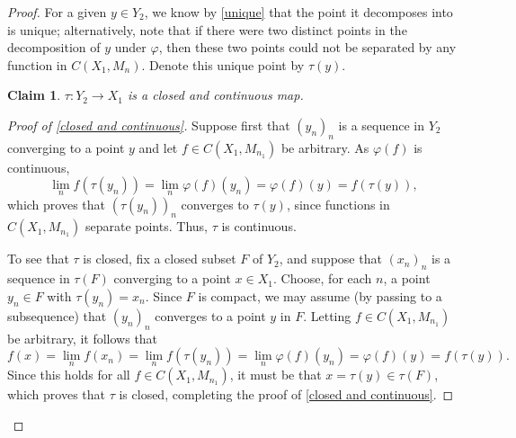 \documentclass[12pt]{amsart}
\numberwithin{equation}{section}
\newtheorem{claim}{Claim}[theorem]
\theoremstyle{definition}
\theoremstyle{remark}
\renewcommand\qedsymbol{/\hspace{-2pt}/}
\begin{document}
\begin{proof}
	For a given $y\in Y_{2}$, we know by \autoref{unique} that the point it decomposes into is unique; alternatively, note that if there were two distinct points in the decomposition of $y$ under $\varphi$, then these two points could not be separated by any function in $C(X_{1},M_{n})$. Denote this unique point by $\tau(y)$.
	
	\begin{claim}
		\label{closed and continuous}
		$\tau\colon Y_{2}\to X_{1}$ is a closed and continuous map. 
	\end{claim}
	
	\renewcommand\qedsymbol{/\hspace{-2pt}/\hspace{-2pt}/\hspace{-2pt}/}
	\begin{proof}[Proof of \autoref{closed and continuous}]
		Suppose first that $(y_{n})_{n}$ is a sequence in $Y_{2}$ converging to a point $y$ and let $f\in C(X_{1},M_{n_{1}})$ be arbitrary. As $\varphi(f)$ is continuous,
		$$
		\lim_{n}f(\tau(y_{n}))=\lim_{n}\varphi(f)(y_{n})=\varphi(f)(y)=f(\tau(y)),
		$$
		which proves that $(\tau(y_{n}))_{n}$ converges to $\tau(y)$, since functions in $C(X_{1},M_{n_{1}})$ separate points. Thus, $\tau$ is continuous.
		
		To see that $\tau$ is closed, fix a closed subset $F$ of $Y_{2}$, and suppose that $(x_{n})_{n}$ is a sequence in $\tau(F)$ converging to a point $x\in X_{1}$. Choose, for each $n$, a point $y_{n}\in F$ with $\tau(y_{n})=x_{n}$. Since $F$ is compact, we may assume (by passing to a subsequence) that $(y_{n})_{n}$ converges to a point $y$ in $F$. Letting $f\in C(X_{1},M_{n_{1}})$ be arbitrary, it follows that 
		$$
		f(x)=\lim_{n}f(x_{n})=\lim_{n}f(\tau(y_{n}))=\lim_{n}\varphi(f)(y_{n})=\varphi(f)(y)=f(\tau(y)).
		$$ 
		Since this holds for all $f\in C(X_{1},M_{n_{1}})$, it must be that $x=\tau(y)\in \tau(F)$, which proves that $\tau$ is closed, completing the proof of \autoref{closed and continuous}. 
	\end{proof}
	

\end{proof}
\end{document}
